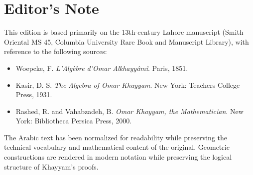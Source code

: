 \clearpage

\section*{Editor's Note}


This edition is based primarily on the 13th-century Lahore manuscript (Smith Oriental MS 45, Columbia University Rare Book and Manuscript Library), with reference to the following sources:

\begin{itemize}
[noitemsep]
\item Woepcke, F. 
\textit{L'Algèbre d'Omar Alkhayyâmî}. Paris, 1851.
\item Kasir, D. S. 
\textit{The Algebra of Omar Khayyam}. New York: Teachers College Press, 1931.
\item Rashed, R. and Vahabzadeh, B. 
\textit{Omar Khayyam, the Mathematician}. New York: Bibliotheca Persica Press, 2000.

\end{itemize}
The Arabic text has been normalized for readability while preserving the technical vocabulary and mathematical content of the original.
Geometric constructions are rendered in modern notation while preserving the logical structure of Khayyam's proofs.




